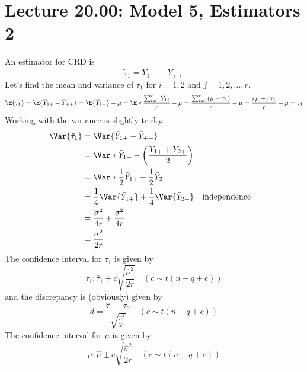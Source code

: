 \section{Lecture 20.00: Model 5, Estimators 2}
An estimator for CRD is
\[ \tilde{\tau}_1=\bar{Y}_{1+}-\bar{Y}_{++} \]
Let's find the mean and variance of $ \tilde{\tau_1} $ for $ i=1,2 $ and
$ j=1,2,\ldots,r $.
\[ \E{\tilde{\tau}_1}
      =\E{\bar{Y}_{1+}-\bar{Y}_{++}}
      =\E{\bar{Y}_{1+}}-\mu
      =\E*{\frac{\sum_{i=1}^{r} Y_{1j}}{r}}-\mu
      =\frac{\sum_{i=1}^{r} (\mu+\tau_1)}{r} -\mu
      =\frac{r\mu+r\tau_1}{r} -\mu
      =\tau_1 \]
Working with the variance is slightly tricky.
\begin{align*}
      \Var{\tilde{\tau}_1}
       & =\Var{\bar{Y}_{1+}-\bar{Y}_{++}}                                                                 \\
       & =\Var*{\bar{Y}_{1+}-\biggl(\frac{\bar{Y}_{1+}+\bar{Y}_{2+}}{2} \biggr)}                          \\
       & =\Var*{\frac{1}{2} \bar{Y}_{1+}-\frac{1}{2} \bar{Y}_{2+}}                                        \\
       & =\frac{1}{4}\Var{\bar{Y}_{1+}}+\frac{1}{4} \Var{\bar{Y}_{2+}}           &  & \text{independence} \\
       & =\frac{\sigma^2}{4r}+\frac{\sigma^2}{4r}                                                         \\
       & =\frac{\sigma^2}{2r}
\end{align*}
The confidence interval for $ \tau_1 $ is given by
\[ \tau_1:\hat{\tau}_1\pm c\sqrt{\frac{\hat{\sigma}^2}{2r}}\quad(c\sim t(n-q+c)) \]
and the discrepancy is (obviously) given by
\[ d=\frac{\hat{\tau}_1-\tau_0}{\displaystyle \sqrt{\frac{\hat{\sigma}^2}{2r}}}\quad(c\sim t(n-q+c))  \]
The confidence interval for $ \mu $ is given by
\[ \mu:\hat{\mu}\pm c\sqrt{\frac{\hat{\sigma}^2}{2r}}\quad(c\sim t(n-q+c)) \]
